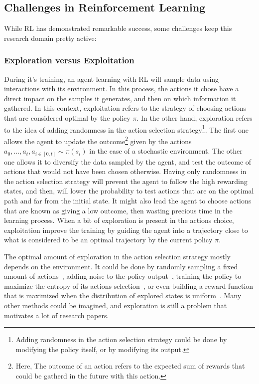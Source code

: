 \subsection{Challenges in Reinforcement Learning}\label{subsection:bg:rl:challenges-in-reinforcement-learning}

While RL has demonstrated remarkable success, some challenges keep this research domain pretty active:

\subsubsection{Exploration versus Exploitation}\label{subsubsection:bg:rl:prblems:exploration-exploitation}

During it's training, an agent learning with RL will sample data using interactions with its environment.
In this process, the actions it chose have a direct impact on the samples it generates, and then on which information
it gathered.
In this context, exploitation refers to the strategy of choosing actions that are considered optimal by the policy $\pi$.
In the other hand, exploration refers to the idea of adding randomness in the action selection
strategy\footnote{Adding
randomness in the action selection strategy could be done by modifying the policy itself, or by modifying its output.}.
The first one allows the agent to update the outcome\footnote{Here, The outcome of an action refers to the expected sum
of rewards that could be gatherd in the future with this action.} given by the actions
${a_0, \dots, a_t}, a_{i \in [0, t]}\sim\pi(s_i)$ in the case of a stochastic environment.
The other one allows it to diversify the data sampled by the agent, and test the outcome of actions that would not have
been chosen otherwise.
Having only randomness in the action selection strategy will prevent the agent to follow the high rewarding states, and
then, will lower the probability to test actions that are on the optimal path and far from the initial state.
It might also lead the agent to choose actions that are known as giving a low outcome, then wasting precious time in
the learning process.
When a bit of exploration is present in the actions choice, exploitation improve the training by guiding the agent into
a trajectory close to what is considered to be an optimal trajectory by the current policy $\pi$.

The optimal amount of exploration in the action selection strategy mostly depends on the environment.
It could be done by randomly sampling a fixed amount of actions~\citep{mnih2013playing}, adding noise to the policy
output~\citep{lillicrap2015continuous}, training the policy to maximize the entropy of its actions
selection~\citep{haarnoja2018soft}, or even building a reward function that is maximized when the distribution of
explored states is uniform~\citep{pong2019skew}.
Many other methods could be imagined, and exploration is still a problem that motivates a lot of research papers.

